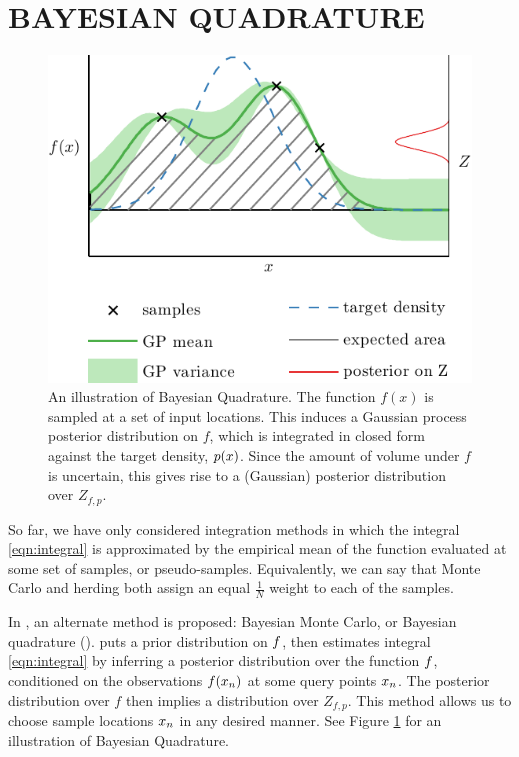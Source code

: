 \documentclass[]{article}
\begin{document}
\section{BAYESIAN QUADRATURE} 

\begin{figure}
\centering
\includegraphics[width=\columnwidth]{figures/bq_intro4}
\caption{An illustration of Bayesian Quadrature.  The function $f(x)$ is sampled at a set of input locations.  This induces a Gaussian process posterior distribution on $f$, which is integrated in closed form against the target density, $p({x})$.  Since the amount of volume under $f$ is uncertain, this gives rise to a (Gaussian) posterior distribution over $Z_{f,p}$.}
\label{fig:bq_intro}
\end{figure}

So far, we have only considered integration methods in which the integral \eqref{eqn:integral} is approximated by the empirical mean of the function evaluated at some set of samples, or pseudo-samples.  Equivalently, we can say that Monte Carlo and herding both assign an equal $\frac{1}{N}$ weight to each of the samples.

In \citep{BZMonteCarlo}, an alternate method is proposed: Bayesian Monte Carlo, or Bayesian quadrature (\bq).  \bq{} puts a prior distribution on ${f}$, then estimates integral \eqref{eqn:integral} by inferring a posterior distribution over the function ${f}$, conditioned on the observations ${f}({x}_n)$ at some query points ${x}_n$.  The posterior distribution over $f$ then implies a distribution over $Z_{f,p}$.  This method allows us to choose sample locations ${x}_n$ in any desired manner. See Figure \ref{fig:bq_intro} for an illustration of Bayesian Quadrature.
\end{document}
